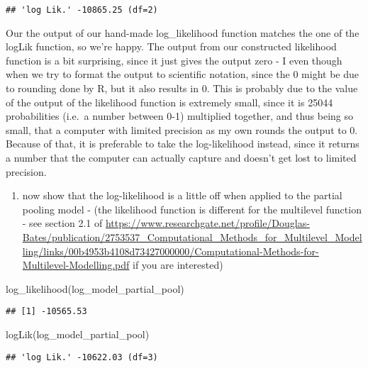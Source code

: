 \documentclass[
]{article}
\newenvironment{Shaded}{\begin{snugshade}}{\end{snugshade}}
\newcommand{\FunctionTok}[1]{\textcolor[rgb]{0.00,0.00,0.00}{#1}}
\newcommand{\NormalTok}[1]{#1}
\providecommand{\tightlist}{%
  \setlength{\itemsep}{0pt}\setlength{\parskip}{0pt}}
\begin{document}
\begin{verbatim}
## 'log Lik.' -10865.25 (df=2)
\end{verbatim}

Our the output of our hand-made log\_likelihood function matches the one
of the logLik function, so we're happy. The output from our constructed
likelihood function is a bit surprising, since it just gives the output
zero - I even though when we try to format the output to scientific
notation, since the 0 might be due to rounding done by R, but it also
results in 0. This is probably due to the value of the output of the
likelihood function is extremely small, since it is 25044 probabilities
(i.e.~a number between 0-1) multiplied together, and thus being so
small, that a computer with limited precision as my own rounds the
output to 0. Because of that, it is preferable to take the
log-likelihood instead, since it returns a number that the computer can
actually capture and doesn't get lost to limited precision.

\begin{enumerate}
\def\labelenumi{\roman{enumi}.}
\setcounter{enumi}{3}
\tightlist
\item
  now show that the log-likelihood is a little off when applied to the
  partial pooling model - (the likelihood function is different for the
  multilevel function - see section 2.1 of
  \url{https://www.researchgate.net/profile/Douglas-Bates/publication/2753537_Computational_Methods_for_Multilevel_Modelling/links/00b4953b4108d73427000000/Computational-Methods-for-Multilevel-Modelling.pdf}
  if you are interested)
\end{enumerate}

\begin{Shaded}
\begin{Highlighting}[]
\FunctionTok{log\_likelihood}\NormalTok{(log\_model\_partial\_pool)}
\end{Highlighting}
\end{Shaded}

\begin{verbatim}
## [1] -10565.53
\end{verbatim}

\begin{Shaded}
\begin{Highlighting}[]
\FunctionTok{logLik}\NormalTok{(log\_model\_partial\_pool)}
\end{Highlighting}
\end{Shaded}

\begin{verbatim}
## 'log Lik.' -10622.03 (df=3)
\end{verbatim}
\end{document}
